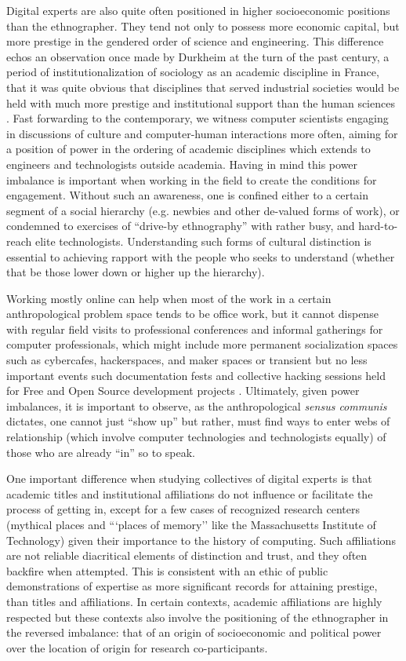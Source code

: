 \documentclass[10pt,letter,oneside]{scrartcl}
\begin{document}
Digital experts are also quite often positioned in higher
socioeconomic positions than the ethnographer. They tend not only to
possess more economic capital, but more prestige in the gendered order
of science and engineering. This difference echos an observation once
made by Durkheim at the turn of the past century, a period of
institutionalization of sociology as an academic discipline in France,
that it was quite obvious that disciplines that served industrial
societies would be held with much more prestige and institutional
support than the human sciences \cite{Durkheim??}. Fast forwarding to
the contemporary, we witness computer scientists engaging in
discussions of culture and computer-human interactions more often,
aiming for a position of power in the ordering of academic disciplines
which extends to engineers and technologists outside academia. Having
in mind this power imbalance is important when working in the field to
create the conditions for engagement.  Without such an awareness, one
is confined either to a certain segment of a social hierarchy
(e.g. newbies and other de-valued forms of work), or condemned to
exercises of ``drive-by ethnography'' with rather busy, and
hard-to-reach elite technologists.  Understanding such forms of
cultural distinction is essential to achieving rapport with the people
who seeks to understand (whether that be those lower down or higher up
the hierarchy).  

Working mostly online can help when most of the work in a certain
anthropological problem space tends to be office work, but it cannot
dispense with regular field visits to professional conferences and
informal gatherings for computer professionals, which might include
more permanent socialization spaces such as cybercafes, hackerspaces,
and maker spaces or transient but no less important events such
documentation fests and collective hacking sessions held for Free and
Open Source development projects
\cite{ColemanAQ,BurrellGhana}. Ultimately, given power imbalances, it
is important to observe, as the anthropological \emph{sensus communis}
dictates, one cannot just ``show up'' but rather, must find ways to
enter webs of relationship (which involve computer technologies and
technologists equally) of those who are already ``in'' so to speak.

One important difference when studying collectives of digital experts
is that academic titles and institutional affiliations do not
influence or facilitate the process of getting in, except for a few
cases of recognized research centers (mythical places and ```places of
memory'' like the Massachusetts Institute of Technology) given their importance to the history of
computing. Such affiliations are not reliable diacritical elements of
distinction and trust, and they often backfire when attempted.  This
is consistent with an ethic of public demonstrations of expertise as more
significant records for attaining prestige, than titles and
affiliations. In certain contexts, academic affiliations are highly
respected but these contexts also involve the positioning of the
ethnographer in the reversed imbalance: that of an origin of
socioeconomic and political power over the location of origin for
research co-participants.
\end{document}
